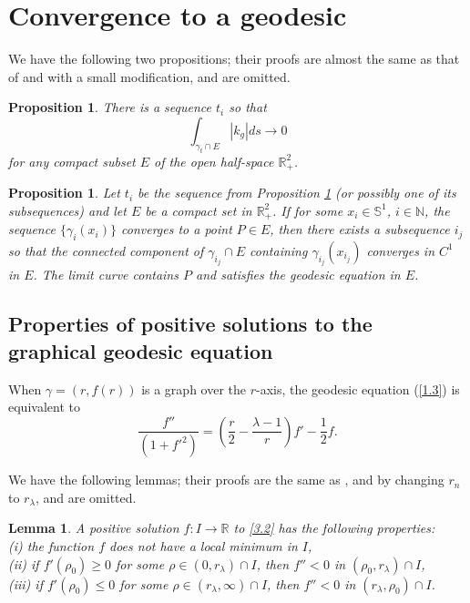 \documentclass{amsart}
\newtheorem{lem}[theorem]{Lemma}
\theoremstyle{Corollary}
\newtheorem{prop}[theorem]{Proposition}
\numberwithin{equation}{section}
\begin{document}
\section{Convergence to a geodesic}


We have the following two propositions;
their proofs are almost the same as that of  \cite[Proposition 14]{Drugan&Nguyen}
and  \cite[Proposition 15]{Drugan&Nguyen} with a small modification,
and are omitted.

\begin{prop}\label{prop14}
There is a sequence $t_i$ so that
\begin{equation}\label{3.1}
\int_{\gamma_t\cap E}|k_g|ds\to 0
\end{equation}
for any compact subset $E$ of the open half-space $\mathbb{R}^2_+$.
\end{prop}

\begin{prop}\label{prop15}
Let $t_i$ be the sequence from Proposition \ref{prop14}
(or possibly one of its subsequences) and let $E$ be a compact set in $\mathbb{R}^2_+$.
If for some $x_i\in\mathbb{S}^1$, $i\in\mathbb{N}$,
the sequence $\{\gamma_i(x_i)\}$ converges to a point $P\in E$, then there exists
a subsequence $i_j$ so that the connected component
of $\gamma_{i_j}\cap E$ containing $\gamma_{i_j}(x_{i_j})$ converges in $C^1$ in $E$.
The limit curve contains $P$ and satisfies the geodesic equation in $E$.
\end{prop}

\subsection{Properties of positive solutions to
the graphical geodesic equation}

When $\gamma=(r,f(r))$
is a graph over the $r$-axis, the geodesic equation (\ref{1.3}) is equivalent to
\begin{equation}\label{3.2}
\frac{f''}{(1+f'^2)}=\left(\frac{r}{2}-\frac{\lambda-1}{r}\right)f'-\frac{1}{2}f.
\end{equation}

We have the following lemmas; their proofs are the same as \cite[Lemma 16]{Drugan&Nguyen}, \cite[Lemma 17]{Drugan&Nguyen}
and \cite[Lemma 18]{Drugan&Nguyen}
by changing $r_n$ to $r_\lambda$,
and are omitted.

\begin{lem}\label{lem16}
A positive solution $f:I\to\mathbb{R}$ to \eqref{3.2} has the following properties:\\
(i) the function $f$ does not have a local minimum in $I$,\\
(ii) if $f'(\rho_0)\geq 0$ for some $\rho\in (0,r_\lambda)\cap I$, then $f''<0$ in $(\rho_0,r_\lambda)\cap I$,\\
(iii) if $f'(\rho_0)\leq 0$ for some $\rho\in (r_\lambda,\infty)\cap I$, then $f''<0$ in $(r_\lambda,\rho_0)\cap I$.
\end{lem}
\end{document}
